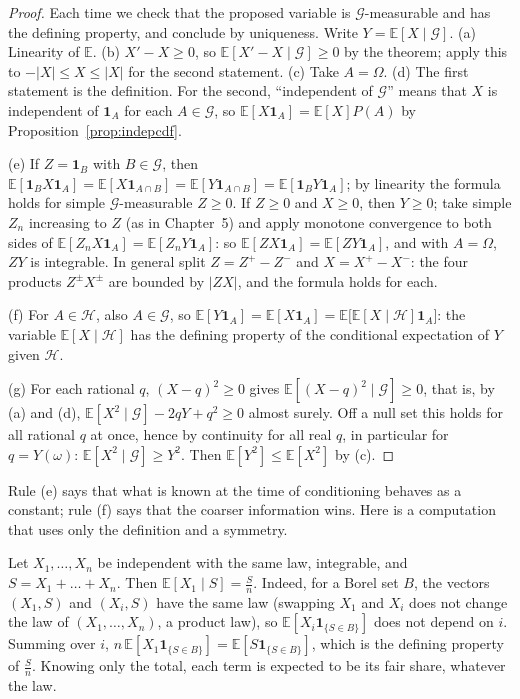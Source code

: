 \begin{proof}
Each time we check that the proposed variable is $\mathcal G$-measurable and has the defining property, and conclude by uniqueness.
Write $Y=\mathbb E[X\mid\mathcal G]$.
(a) Linearity of $\mathbb E$. (b) $X'-X\ge0$, so $\mathbb E[X'-X\mid\mathcal G]\ge0$ by the theorem; apply this to $-|X|\le X\le|X|$ for the second statement.
(c) Take $A=\Omega$. (d) The first statement is the definition. For the second, ``independent of $\mathcal G$'' means that $X$ is independent of
$\mathbf 1_A$ for each $A\in\mathcal G$, so $\mathbb E[X\mathbf 1_A]=\mathbb E[X]P(A)$ by Proposition~\ref{prop:indepcdf}.

(e) If $Z=\mathbf 1_B$ with $B\in\mathcal G$, then $\mathbb E[\mathbf 1_BX\mathbf 1_A]=\mathbb E[X\mathbf 1_{A\cap B}]=\mathbb E[Y\mathbf 1_{A\cap B}]=\mathbb E[\mathbf 1_BY\mathbf 1_A]$; by linearity the formula holds
for simple $\mathcal G$-measurable $Z\ge0$. If $Z\ge0$ and $X\ge0$, then $Y\ge0$; take simple $Z_n$ increasing to $Z$ (as in Chapter~5) and apply
monotone convergence to both sides of $\mathbb E[Z_nX\mathbf 1_A]=\mathbb E[Z_nY\mathbf 1_A]$: so $\mathbb E[ZX\mathbf 1_A]=\mathbb E[ZY\mathbf 1_A]$, and with $A=\Omega$, $ZY$ is integrable.
In general split $Z=Z^+-Z^-$ and $X=X^+-X^-$: the four products $Z^\pm X^\pm$ are bounded by $|ZX|$, and the formula holds for each.

(f) For $A\in\mathcal H$, also $A\in\mathcal G$, so $\mathbb E[Y\mathbf 1_A]=\mathbb E[X\mathbf 1_A]=\mathbb E\bigl[\mathbb E[X\mid\mathcal H]\mathbf 1_A\bigr]$: the variable $\mathbb E[X\mid\mathcal H]$ has the defining
property of the conditional expectation of $Y$ given $\mathcal H$.

(g) For each rational $q$, $(X-q)^2\ge0$ gives $\mathbb E[(X-q)^2\mid\mathcal G]\ge0$, that is, by (a) and (d), $\mathbb E[X^2\mid\mathcal G]-2qY+q^2\ge0$ almost surely. Off a
null set this holds for all rational $q$ at once, hence by continuity for all real $q$, in particular for $q=Y(\omega)$: $\mathbb E[X^2\mid\mathcal G]\ge Y^2$.
Then $\mathbb E[Y^2]\le\mathbb E[X^2]$ by (c).
\end{proof}

Rule (e) says that what is known at the time of conditioning behaves as a constant; rule (f) says that the coarser
information wins. Here is a computation that uses only the definition and a symmetry.

\begin{example}\label{ex:exchange}
Let $X_1,\dots,X_n$ be independent with the same law, integrable, and $S=X_1+\dots+X_n$. Then $\mathbb E[X_1\mid S]=\frac Sn$. Indeed, for a Borel set $B$, the
vectors $(X_1,S)$ and $(X_i,S)$ have the same law (swapping $X_1$ and $X_i$ does not change the law of $(X_1,\dots,X_n)$, a product law), so
$\mathbb E[X_i\mathbf 1_{\{S\in B\}}]$ does not depend on $i$. Summing over $i$, $n\,\mathbb E[X_1\mathbf 1_{\{S\in B\}}]=\mathbb E[S\mathbf 1_{\{S\in B\}}]$, which is the defining property of $\frac Sn$.
Knowing only the total, each term is expected to be its fair share, whatever the law.
\end{example}

